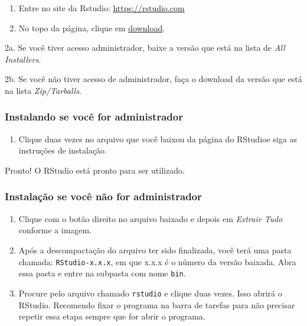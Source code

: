 \documentclass[
]{book}
\providecommand{\tightlist}{%
  \setlength{\itemsep}{0pt}\setlength{\parskip}{0pt}}
\begin{document}
\begin{enumerate}
\def\labelenumi{\arabic{enumi}.}
\item
  Entre no site da Rstudio: \url{https://rstudio.com}
\item
  No topo da página, clique em \href{https://rstudio.com/products/rstudio/download/}{download}.
\end{enumerate}

2a. Se você tiver acesso administrador, baixe a versão que está na lista de \emph{All Installers}.

2b. Se você não tiver acesso de administrador, faça o download da versão
que está na lista \emph{Zip/Tarballs}.

\hypertarget{instalando-se-vocuxea-for-administrador}{%
\subsubsection*{Instalando se você for administrador}\label{instalando-se-vocuxea-for-administrador}}

\begin{enumerate}
\def\labelenumi{\arabic{enumi}.}
\setcounter{enumi}{2}
\tightlist
\item
  Clique duas vezes no arquivo que você baixou da página do RStudioe siga as instruções de instalação.
\end{enumerate}

Pronto! O RStudio está pronto para ser utilizado.

\hypertarget{instalauxe7uxe3o-se-vocuxea-nuxe3o-for-administrador}{%
\subsubsection*{Instalação se você não for administrador}\label{instalauxe7uxe3o-se-vocuxea-nuxe3o-for-administrador}}

\begin{enumerate}
\def\labelenumi{\arabic{enumi}.}
\setcounter{enumi}{2}
\item
  Clique com o botão direito no arquivo baixado e depois em \emph{Extrair Tudo} conforme a imagem.
\item
  Após a descompactação do arquivo ter sido finalizada, você terá uma pasta chamada: \texttt{RStudio-x.x.x}, em que x.x.x é o número da versão baixada. Abra essa pasta e entre na subpasta com nome \texttt{bin}.
\item
  Procure pelo arquivo chamado \texttt{rstudio} e clique duas vezes. Isso abrirá o RStudio. Recomendo fixar o programa na barra de tarefas para não precisar repetir essa etapa sempre que for abrir o programa.
\end{enumerate}
\end{document}

